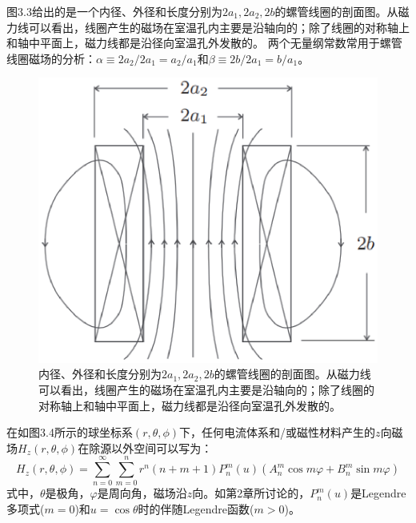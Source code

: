 图3.3给出的是一个内径、外径和长度分别为$2a_1, 2a_2, 2b$的螺管线圈的剖面图。从磁力线可以看出，线圈产生的磁场在室温孔内主要是沿轴向的；除了线圈的对称轴上和轴中平面上，磁力线都是沿径向室温孔外发散的。
两个无量纲常数常用于螺管线圈磁场的分析：$\alpha\equiv 2a_2/2a_1=a_2/a_1$和$\beta\equiv 2b/2a_1=b/a_1$。
\begin{figure}[htbp]
	\centering
	\includegraphics[scale=0.5]{chpt3/figs/fig3.3.eps}
	\caption{内径、外径和长度分别为$2a_1, 2a_2, 2b$的螺管线圈的剖面图。从磁力线可以看出，线圈产生的磁场在室温孔内主要是沿轴向的；除了线圈的对称轴上和轴中平面上，磁力线都是沿径向室温孔外发散的。}
\end{figure}

在如图3.4所示的球坐标系$(r,\theta,\phi)$下，任何电流体系和/或磁性材料产生的$z$向磁场$H_z(r,\theta,\phi)$在除源以外空间可以写为：
\begin{equation}\label{eqn:solenoid coil hz}
  H_z (r,\theta,\phi)=\sum_{n=0}^\infty \sum_{m=0}^n r^n (n+m+1) P_n^m(u)(A_n^m\cos m\varphi+B_n^m\sin m\varphi)
\end{equation}
式中，$\theta$是极角，$\varphi$是周向角，磁场沿$z$向。如第2章所讨论的，$P_n^m(u)$是Legendre多项式($m=0$)和$u=\cos\theta$时的伴随Legendre函数($m>0$)。

